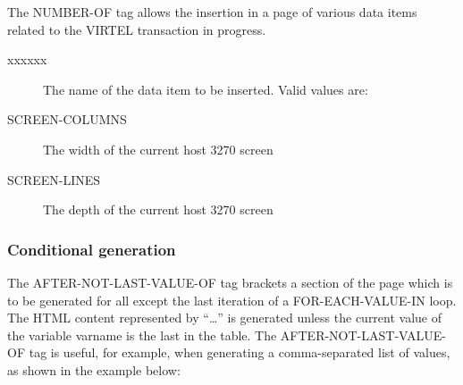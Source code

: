 \documentclass[letterpaper,10pt,english]{sphinxmanual}
\begin{document}
The NUMBER-OF tag allows the insertion in a page of various data items related to the VIRTEL transaction in progress.
\begin{description}
\item[{xxxxxx}] \leavevmode
The name of the data item to be inserted. Valid values are:

\item[{SCREEN-COLUMNS}] \leavevmode
The width of the current host 3270 screen

\item[{SCREEN-LINES}] \leavevmode
The depth of the current host 3270 screen

\end{description}


\subsubsection{Conditional generation}
\label{\detokenize{User_Guide:conditional-generation}}

\begin{sphinxVerbatim}[commandchars=\\\{\}]
  
\end{sphinxVerbatim}

The AFTER-NOT-LAST-VALUE-OF tag brackets a section of the page which is to be generated for all except the last iteration of a FOR-EACH-VALUE-IN loop. The HTML content represented by “…” is generated unless the current value of the variable varname is the last in the table. The AFTER-NOT-LAST-VALUE-OF tag is useful, for example, when generating a comma-separated list of values, as shown in the example below:
\end{document}
